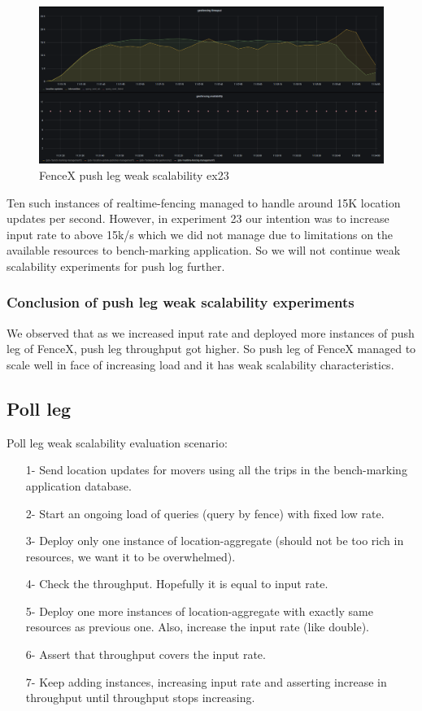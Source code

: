 \documentclass[a4]{report}
\begin{document}
    \begin{figure}[h!]
        \centering
        \caption{FenceX push leg weak scalability ex23}
        \label{fig:ex23}
        \includegraphics[width=\linewidth, scale=2]{images/evaluation/ex23-benchmarking-ongoing-2per2sec.png}
    \end{figure}

    Ten such instances of realtime-fencing managed to handle around 15K location updates per second.
    However, in experiment 23 our intention was to increase input rate to above 15k/s which we did not manage due to
    limitations on the available resources to bench-marking application.
    So we will not continue weak scalability experiments for push log further.

    \subsubsection{Conclusion of push leg weak scalability experiments}
    We observed that as we increased input rate and deployed more instances of push leg of FenceX, push leg
    throughput got higher.
    So push leg of FenceX managed to scale well in face of increasing load and it has weak scalability characteristics.

    \subsection{Poll leg}
    Poll leg weak scalability evaluation scenario:
    \begin{itemize}
        \item[1-] Send location updates for movers using all the trips in the bench-marking application database.
        \item[2-] Start an ongoing load of queries (query by fence) with fixed low rate.
        \item[3-] Deploy only one instance of location-aggregate (should not be too rich in resources, we want it to
        be overwhelmed).
        \item[4-] Check the throughput.
        Hopefully it is equal to input rate.
        \item[5-] Deploy one more instances of location-aggregate with exactly same resources as previous one. Also,
        increase the input rate (like double).
        \item[6-] Assert that throughput covers the input rate.
        \item[7-] Keep adding instances, increasing input rate and asserting increase in throughput until throughput
        stops increasing.
    \end{itemize}
\end{document}
